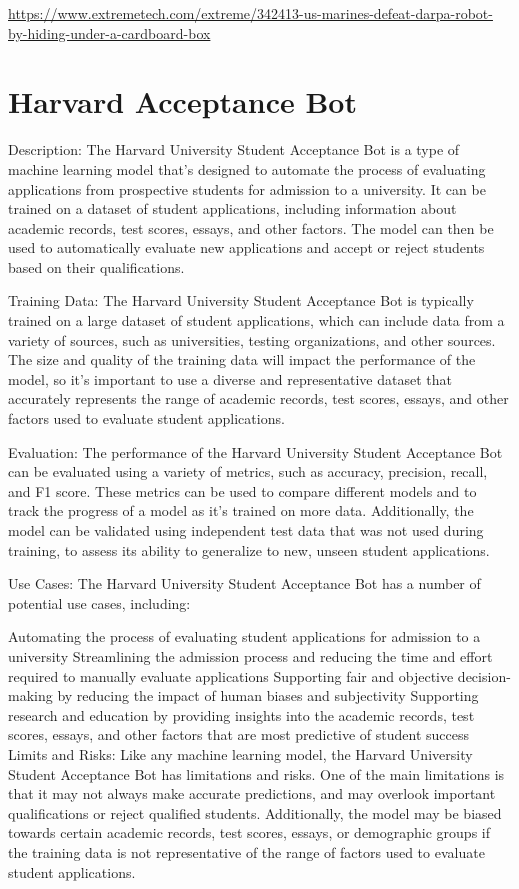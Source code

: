 \url{https://www.extremetech.com/extreme/342413-us-marines-defeat-darpa-robot-by-hiding-under-a-cardboard-box}

\section{Harvard Acceptance Bot}

Description:
The Harvard University Student Acceptance Bot is a type of machine learning model that's designed to automate the process of evaluating applications from prospective students for admission to a university. It can be trained on a dataset of student applications, including information about academic records, test scores, essays, and other factors. The model can then be used to automatically evaluate new applications and accept or reject students based on their qualifications.

Training Data:
The Harvard University Student Acceptance Bot is typically trained on a large dataset of student applications, which can include data from a variety of sources, such as universities, testing organizations, and other sources. The size and quality of the training data will impact the performance of the model, so it's important to use a diverse and representative dataset that accurately represents the range of academic records, test scores, essays, and other factors used to evaluate student applications.

Evaluation:
The performance of the Harvard University Student Acceptance Bot can be evaluated using a variety of metrics, such as accuracy, precision, recall, and F1 score. These metrics can be used to compare different models and to track the progress of a model as it's trained on more data. Additionally, the model can be validated using independent test data that was not used during training, to assess its ability to generalize to new, unseen student applications.

Use Cases:
The Harvard University Student Acceptance Bot has a number of potential use cases, including:

Automating the process of evaluating student applications for admission to a university
Streamlining the admission process and reducing the time and effort required to manually evaluate applications
Supporting fair and objective decision-making by reducing the impact of human biases and subjectivity
Supporting research and education by providing insights into the academic records, test scores, essays, and other factors that are most predictive of student success
Limits and Risks:
Like any machine learning model, the Harvard University Student Acceptance Bot has limitations and risks. One of the main limitations is that it may not always make accurate predictions, and may overlook important qualifications or reject qualified students. Additionally, the model may be biased towards certain academic records, test scores, essays, or demographic groups if the training data is not representative of the range of factors used to evaluate student applications.

